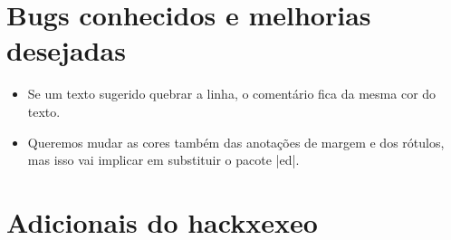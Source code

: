 \documentclass{article}
\begin{document}
    
    \section{Bugs conhecidos e melhorias desejadas}
    
    \begin{itemize}
        \item Se um texto sugerido quebrar a linha, o comentário fica da mesma cor  do texto. 
        \item Queremos mudar as cores também das anotações de margem e dos rótulos, mas isso vai implicar em substituir o pacote |ed|.
    \end{itemize}
    
    \printbibliography
    
    \newpage
    \section*{Adicionais do hackxexeo}
    \printhacksxexeoversion
    \newpage
    \listofassunto
    \newpage
    \listofcomentario
    \newpage
    \listofcomentarioref   
    
\end{document}
